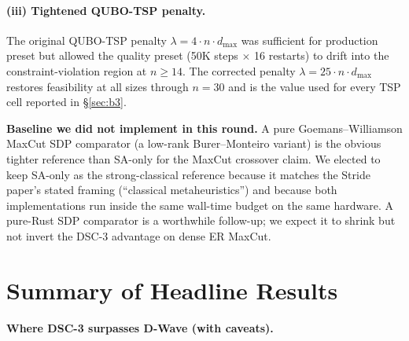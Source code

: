 \documentclass[11pt,a4paper]{article}
\begin{document}
\paragraph{(iii) Tightened QUBO-TSP penalty.}
The original QUBO-TSP penalty $\lambda = 4 \cdot n \cdot d_{\max}$ was
sufficient for production preset but allowed the quality preset (50K
steps $\times$ 16 restarts) to drift into the constraint-violation region
at $n\!\ge\!14$. The corrected penalty $\lambda = 25 \cdot n \cdot d_{\max}$
restores feasibility at all sizes through $n\!=\!30$ and is the value
used for every TSP cell reported in §\ref{sec:b3}.

\medskip
\noindent\textbf{Baseline we did not implement in this round.} A pure
Goemans--Williamson MaxCut SDP comparator (a low-rank Burer--Monteiro
variant) is the obvious tighter reference than SA-only for the MaxCut
crossover claim. We elected to keep SA-only as the strong-classical
reference because it matches the Stride paper's stated framing
(``classical metaheuristics'') and because both implementations run
inside the same wall-time budget on the same hardware. A pure-Rust
SDP comparator is a worthwhile follow-up; we expect it to shrink but
not invert the DSC-3 advantage on dense ER MaxCut.

\section{Summary of Headline Results}
\label{sec:summary}

\paragraph{Where DSC-3 surpasses D-Wave (with caveats).}
\end{document}
